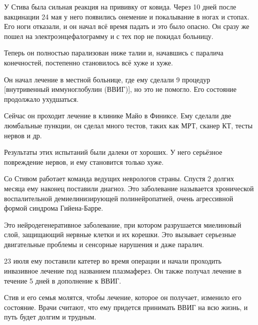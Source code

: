 У Стива была сильная реакция на прививку от ковида. Через 10 дней после
вакцинации 24 мая у него появились онемение и покалывание в ногах и стопах. Его
ноги отказали, и он начал всё время падать и это было опасно. Он сразу же пошел
на электроэнцефалограмму и с тех пор не покидал больницу.

Теперь он полностью парализован ниже талии и, начавшись с паралича конечностей,
постепенно становилось всё хуже и хуже.

Он начал лечение в местной больнице, где ему сделали 9 процедур [внутривенный
  иммуноглобулин (ВВИГ)], но это не помогло. Его состояние продолжало
ухудшаться.

Сейчас он проходит лечение в клинике Майо в Финиксе. Ему сделали две люмбальные
пункции, он сделал много тестов, таких как МРТ, сканер КТ, тесты нервов и др.

Результаты этих испытаний были далеки от хороших. У него серьёзное повреждение
нервов, и ему становится только хуже.

Со Стивом работает команда ведущих неврологов страны. Спустя 2 долгих месяца ему
наконец поставили диагноз. Это заболевание называется хронической воспалительной
демиелинизирующей полинейропатией, очень агрессивной формой синдрома
Гийена-Барре.

Это нейродегенеративное заболевание, при котором разрушается миелиновый слой,
защищающий нервные клетки и их корешки. Это вызывает серьезные двигательные
проблемы и сенсорные нарушения и даже паралич.

23 июля ему поставили катетер во время операции и начали проходить инвазивное
лечение под названием плазмаферез. Он также получал лечение в течение 5 дней в
дополнение к ВВИГ.

Стив и его семья молятся, чтобы лечение, которое он получает, изменило его
состояние. Врачи считают, что ему придется принимать ВВИГ на всю жизнь, и путь
будет долгим и трудным.
